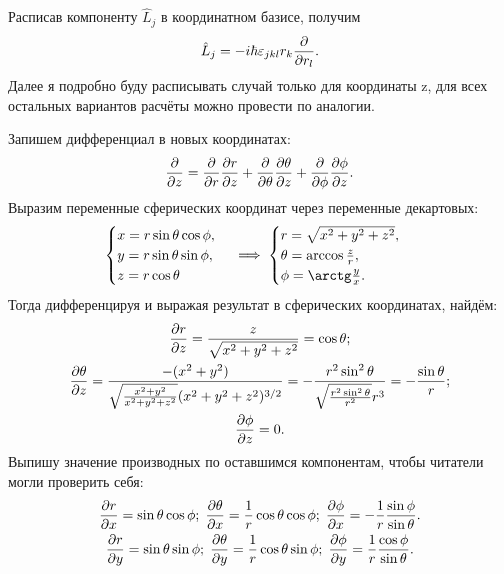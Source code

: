 Расписав компоненту $\hat{L}_j$ в координатном базисе, получим
\[
  \hat{L}_j = -i\hbar\varepsilon_{jkl}r_k\frac{\partial }{\partial r_l}.
\]
Далее я подробно буду расписывать случай только для координаты z, для всех
остальных вариантов расчёты можно провести по аналогии.

Запишем дифференциал в новых координатах:
\[
  \frac{\partial }{\partial z} = \frac{\partial }{\partial r}\frac{\partial r}{\partial z} + \frac{\partial }{\partial \theta}\frac{\partial \theta}{\partial z} + \frac{\partial }{\partial \phi}\frac{\partial \phi}{\partial z}.
\]
Выразим переменные сферических координат через переменные декартовых:
\begin{equation*}
  \begin{cases}
    x = r\sin\theta\cos\phi,\\
    y = r\sin\theta\sin\phi,\\
    z = r\cos\theta
  \end{cases}
  \implies
  \begin{cases}
    r = \sqrt{x^2 + y^2 + z^2},\\
    \theta = \arccos\frac{z}{r},\\
    \phi = \arctg\frac{y}{x}.
  \end{cases}
\end{equation*}
Тогда дифференцируя и выражая результат в сферических координатах, найдём:
\begin{gather*}
  \frac{\partial r}{\partial z} = \frac{z}{\sqrt{x^2 + y^2 + z^2}} = \cos\theta;\\
  \frac{\partial \theta}{\partial z} = \frac{-(x^2+y^2)}{\sqrt{\frac{x^2 + y^2}{x^2+y^2+z^2}}(x^2+y^2+z^2)^{3/2}}= -\frac{r^2\sin^2\theta}{\sqrt{\frac{r^2\sin^2\theta}{r^2}}r^3} = -\frac{\sin\theta}{r}; \\
  \frac{\partial \phi}{\partial z} = 0.
\end{gather*}
Выпишу значение производных по оставшимся компонентам, чтобы читатели могли
проверить себя:
\begin{gather*}
  \frac{\partial r}{\partial x} = \sin\theta\cos\phi; \; \frac{\partial \theta}{\partial x} = \frac{1}{r}\cos\theta\cos\phi; \; \frac{\partial \phi}{\partial x} = -\frac{1}{r}\frac{\sin\phi}{\sin\theta}.\\
  \frac{\partial r}{\partial y} = \sin\theta\sin\phi; \; \frac{\partial \theta}{\partial y} = \frac{1}{r}\cos\theta\sin\phi; \; \frac{\partial \phi}{\partial y} = \frac{1}{r}\frac{\cos\phi}{\sin\theta}.
\end{gather*}

